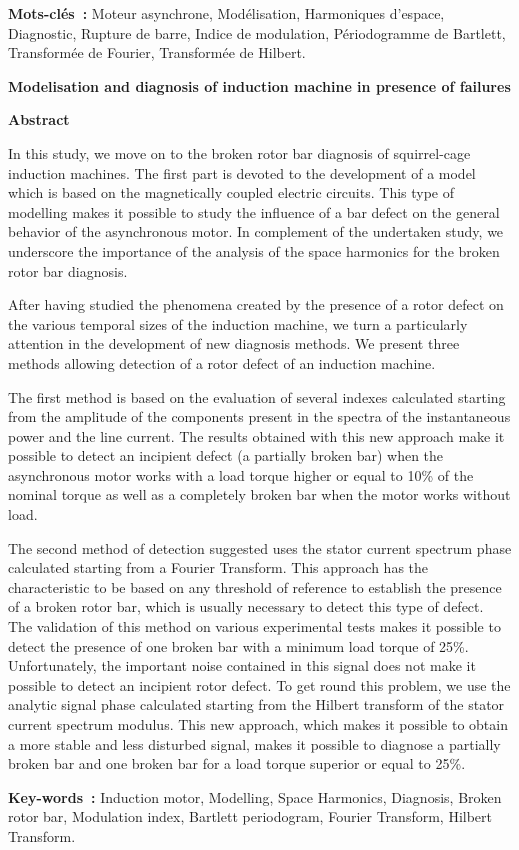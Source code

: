 \vspace{0.25cm}

\noindent\textbf{Mots-clés~:} Moteur asynchrone, Modélisation,
Harmoniques d'espace, Diagnostic, Rupture de barre, Indice de
modulation, Périodogramme de Bartlett, Transformée de Fourier,
Transformée de Hilbert. \fontsize{12pt}{1.5}\selectfont

\vskip15mm


\begin{center}
\textbf{Modelisation and diagnosis of induction machine in
presence of failures}
\end{center}


\begin{center}
\textbf{\large{Abstract}}
\end{center}

\fontsize{10pt}{1}\selectfont

In this study, we move on to the broken rotor bar diagnosis of
squirrel-cage induction machines. The first part is devoted to the
development of a model which is based on the magnetically coupled
electric circuits. This type of modelling makes it possible to
study the influence of a bar defect on the general behavior of the
asynchronous motor. In complement of the undertaken study, we
underscore the importance of the analysis of the space harmonics
for the broken rotor bar diagnosis.

After having studied the phenomena created by the presence of a
rotor defect on the various temporal sizes of the induction
machine, we turn a particularly attention in the development of
new diagnosis methods. We present three methods allowing detection
of a rotor defect of an induction machine.

The first method is based on the evaluation of several indexes
calculated starting from the amplitude of the components present
in the spectra of the instantaneous power and the line current.
The results obtained with this new approach make it possible to
detect an incipient defect (a partially broken bar) when the
asynchronous motor works with a load torque higher or equal to
10\% of the nominal torque as well as a completely broken bar when
the motor works without load.

The second method of detection suggested uses the stator current
spectrum phase calculated starting from a Fourier Transform. This
approach has the characteristic to be based on any threshold of
reference to establish the presence of a broken rotor bar, which
is usually necessary to detect this type of defect. The validation
of this method on various experimental tests makes it possible to
detect the presence of one broken bar with a minimum load torque
of 25\%. Unfortunately, the important noise contained in this
signal does not make it possible to detect an incipient rotor
defect. To get round this problem, we use the analytic signal
phase calculated starting from the Hilbert transform of the stator
current spectrum modulus. This new approach, which makes it
possible to obtain a more stable and less disturbed signal, makes
it possible to diagnose a partially broken bar and one broken bar
for a load torque superior or equal to 25\%.

\vspace{0.25cm}

\noindent\textbf{Key-words~:} Induction motor, Modelling, Space
Harmonics, Diagnosis, Broken rotor bar, Modulation index, Bartlett
periodogram, Fourier Transform, Hilbert Transform.
\fontsize{12pt}{1.5}\selectfont

